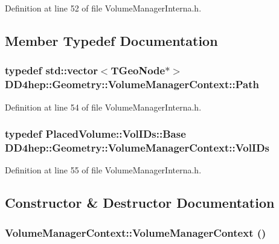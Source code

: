 Definition at line 52 of file VolumeManagerInterna.h.

\subsection{Member Typedef Documentation}
\hypertarget{class_d_d4hep_1_1_geometry_1_1_volume_manager_context_a7873b42c6ad25a77d4d7e240286a934c}{
\subsubsection[{Path}]{\setlength{\rightskip}{0pt plus 5cm}typedef std::vector$<$TGeoNode$\ast$$>$ {\bf DD4hep::Geometry::VolumeManagerContext::Path}}}
\label{class_d_d4hep_1_1_geometry_1_1_volume_manager_context_a7873b42c6ad25a77d4d7e240286a934c}


Definition at line 54 of file VolumeManagerInterna.h.\hypertarget{class_d_d4hep_1_1_geometry_1_1_volume_manager_context_aedf28d4a226428cfc6ebaabaee0b4c9e}{
\subsubsection[{VolIDs}]{\setlength{\rightskip}{0pt plus 5cm}typedef {\bf PlacedVolume::VolIDs::Base} {\bf DD4hep::Geometry::VolumeManagerContext::VolIDs}}}
\label{class_d_d4hep_1_1_geometry_1_1_volume_manager_context_aedf28d4a226428cfc6ebaabaee0b4c9e}


Definition at line 55 of file VolumeManagerInterna.h.

\subsection{Constructor \& Destructor Documentation}
\hypertarget{class_d_d4hep_1_1_geometry_1_1_volume_manager_context_a7fabfa335945589f35053fa3bc3dcfc7}{
\subsubsection[{VolumeManagerContext}]{\setlength{\rightskip}{0pt plus 5cm}VolumeManagerContext::VolumeManagerContext ()}}
\label{class_d_d4hep_1_1_geometry_1_1_volume_manager_context_a7fabfa335945589f35053fa3bc3dcfc7}



